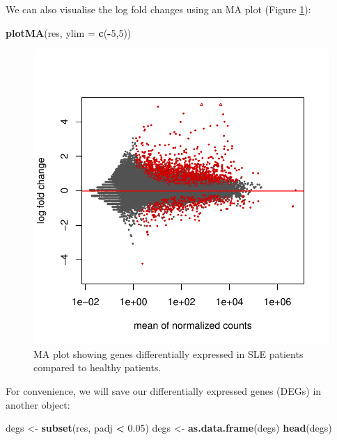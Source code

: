 \documentclass[9pt,a4paper,]{extarticle}
\newenvironment{Shaded}{\begin{snugshade}}{\end{snugshade}}
\newcommand{\KeywordTok}[1]{\textcolor[rgb]{0.13,0.29,0.53}{\textbf{#1}}}
\newcommand{\DataTypeTok}[1]{\textcolor[rgb]{0.13,0.29,0.53}{#1}}
\newcommand{\DecValTok}[1]{\textcolor[rgb]{0.00,0.00,0.81}{#1}}
\newcommand{\FloatTok}[1]{\textcolor[rgb]{0.00,0.00,0.81}{#1}}
\newcommand{\StringTok}[1]{\textcolor[rgb]{0.31,0.60,0.02}{#1}}
\newcommand{\OperatorTok}[1]{\textcolor[rgb]{0.81,0.36,0.00}{\textbf{#1}}}
\newcommand{\NormalTok}[1]{#1}
\begin{document}
We can also visualise the log fold changes using an MA plot (Figure \ref{fig:maplot}):

\begin{Shaded}
\begin{Highlighting}[]
\KeywordTok{plotMA}\NormalTok{(res, }\DataTypeTok{ylim =} \KeywordTok{c}\NormalTok{(}\OperatorTok{-}\DecValTok{5}\NormalTok{,}\DecValTok{5}\NormalTok{))}
\end{Highlighting}
\end{Shaded}

\begin{figure}

{\centering \includegraphics{biocondutor-regulatory-genomics-workflow_files/figure-latex/maplot-1} 

}

\caption{MA plot showing genes differentially expressed in SLE patients compared to healthy patients.}\label{fig:maplot}
\end{figure}

For convenience, we will save our differentially expressed genes (DEGs) in another object:

\begin{Shaded}
\begin{Highlighting}[]
\NormalTok{degs <-}\StringTok{ }\KeywordTok{subset}\NormalTok{(res, padj }\OperatorTok{<}\StringTok{ }\FloatTok{0.05}\NormalTok{)}
\NormalTok{degs <-}\StringTok{ }\KeywordTok{as.data.frame}\NormalTok{(degs)}
\KeywordTok{head}\NormalTok{(degs)}
\end{Highlighting}
\end{Shaded}
\end{document}
